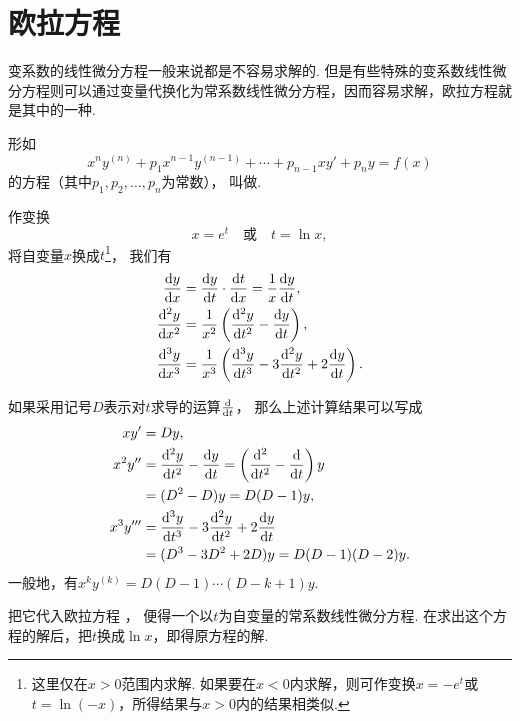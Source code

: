 \section{欧拉方程}
变系数的线性微分方程一般来说都是不容易求解的.
但是有些特殊的变系数线性微分方程则可以通过变量代换化为常系数线性微分方程，因而容易求解，欧拉方程就是其中的一种.

形如\begin{equation}\label{equation:微分方程.欧拉方程的一般形式}
	x^n y^{(n)} + p_1 x^{n-1} y^{(n-1)} + \dotsb + p_{n-1} x y' + p_n y = f(x)
\end{equation}的方程（其中\(p_1,p_2,\dotsc,p_n\)为常数），
叫做.

作变换\begin{equation*}
	x = e^t \quad\text{或}\quad t = \ln x,
\end{equation*}
将自变量\(x\)换成\(t\)\footnote{这里仅在\(x>0\)范围内求解.
如果要在\(x<0\)内求解，则可作变换\(x=-e^t\)或\(t=\ln(-x)\)，所得结果与\(x>0\)内的结果相类似.}，
我们有\begin{align*}
	\dv{y}{x}
	&= \dv{y}{t} \cdot \dv{t}{x} = \frac{1}{x} \dv{y}{t}, \\
	\dv[2]{y}{x}
	&= \frac{1}{x^2} \left( \dv[2]{y}{t} - \dv{y}{t} \right), \\
	\dv[3]{y}{x}
	&= \frac{1}{x^3} \left( \dv[3]{y}{t} - 3 \dv[2]{y}{t} + 2 \dv{y}{t} \right).
\end{align*}

如果采用记号\(D\)表示对\(t\)求导的运算\(\dv{t}\)，
那么上述计算结果可以写成\begin{align*}
	x y' &= Dy, \\
	x^2 y'' &= \dv[2]{y}{t} - \dv{y}{t}
		= \left(\dv[2]{t} - \dv{t}\right)y \\
		&= (D^2 - D)y = D(D-1)y, \\
	x^3 y''' &= \dv[3]{y}{t} - 3 \dv[2]{y}{t} + 2 \dv{y}{t} \\
		&= (D^3-3D^2+2D)y = D(D-1)(D-2)y.
\end{align*}
一般地，有\(x^k y^{(k)} = D(D-1)\dotsm(D-k+1)y\).

把它代入欧拉方程 ，
便得一个以\(t\)为自变量的常系数线性微分方程.
在求出这个方程的解后，把\(t\)换成\(\ln x\)，即得原方程的解.

